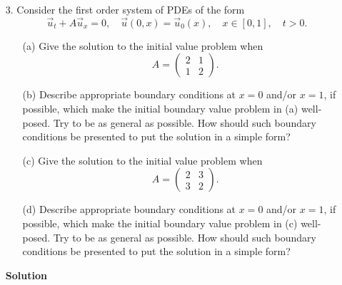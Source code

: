 \documentclass{article}
\begin{document}
\begin{itemize}
\item[3.] Consider the first order system of PDEs of the form
\begin{equation*}
\vec{u}_t + A \vec{u}_x = 0, \quad \vec{u}(0,x) = \vec{u}_0(x), \quad x \in [0,1], \quad t > 0.
\end{equation*}
\begin{itemize}
\item[(a)] Give the solution to the initial value problem when
\begin{equation*}
A = \begin{pmatrix} 2 & 1 \\ 1 & 2 \end{pmatrix}.
\end{equation*}
\item[(b)] Describe appropriate boundary conditions at $x = 0$ and/or $x = 1$, if possible, which make the initial boundary value problem in (a) well-posed. Try to be as general as possible. How should such boundary conditions be presented to put the solution in a simple form?
\item[(c)] Give the solution to the initial value problem when
\begin{equation*}
A = \begin{pmatrix} 2 & 3 \\ 3 & 2 \end{pmatrix}.
\end{equation*}
\item[(d)] Describe appropriate boundary conditions at $x = 0$ and/or $x = 1$, if possible, which make the initial boundary value problem in (c) well-posed. Try to be as general as possible. How should such boundary conditions be presented to put the solution in a simple form?
\end{itemize}

\textbf{Solution}


\end{itemize}
\end{document}
